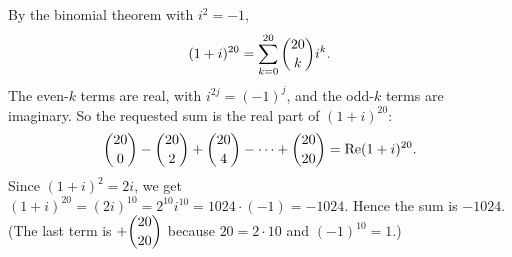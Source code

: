 By the binomial theorem with $i^2=-1$,
\[
(1+i)^{20}=\sum_{k=0}^{20}\dbinom{20}{k}i^k .
\]
The even-$k$ terms are real, with $i^{2j}=(-1)^j$, and the odd-$k$ terms are imaginary. So the requested sum is the real part of $(1+i)^{20}$:
\[
\dbinom{20}{0}-\dbinom{20}{2}+\dbinom{20}{4}-\cdots+\dbinom{20}{20}=\operatorname{Re}(1+i)^{20}.
\]
Since $(1+i)^2=2i$, we get $(1+i)^{20}=(2i)^{10}=2^{10}i^{10}=1024\cdot(-1)=-1024$. Hence the sum is $\boxed{-1024}$. (The last term is $+\dbinom{20}{20}$ because $20=2\cdot10$ and $(-1)^{10}=1$.)

